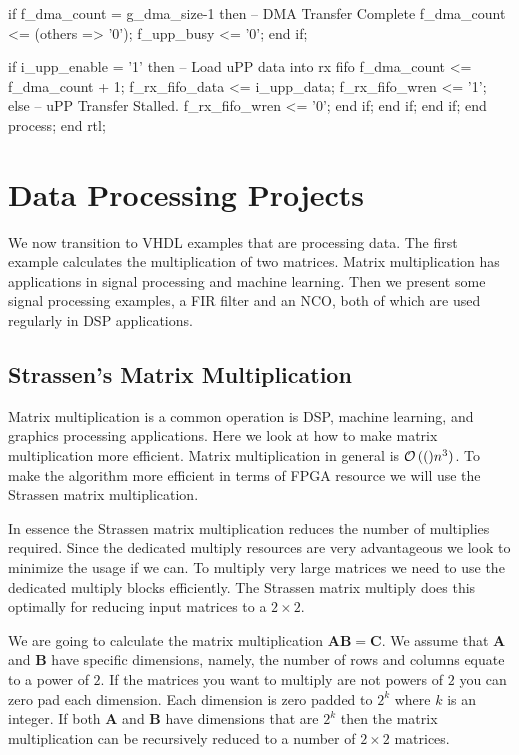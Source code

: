\begin{VHDLlisting}[tabsize=2]
                if f_dma_count = g_dma_size-1 then
                    -- DMA Transfer Complete
                    f_dma_count <= (others => '0');
                    f_upp_busy <= '0';
                end if;
			
                if i_upp_enable = '1' then
                    -- Load uPP data into rx fifo
                    f_dma_count <= f_dma_count + 1;
                    f_rx_fifo_data <= i_upp_data;
                    f_rx_fifo_wren <= '1';
                else
                    -- uPP Transfer Stalled.
                    f_rx_fifo_wren <= '0';
                end if;
            end if;
        end if;
    end process;	
end rtl;
\end{VHDLlisting}

\section{Data Processing Projects}
	
We now transition to \ac{VHDL} examples that are processing data. The first example calculates the multiplication of two matrices. Matrix multiplication has applications in signal processing and machine learning. Then we present some signal processing examples, a \ac{FIR} filter and an \ac{NCO}, both of which are used regularly in \ac{DSP} applications. 

\subsection{Strassen's Matrix Multiplication}
	
Matrix multiplication is a common operation is \ac{DSP}, machine learning, and graphics processing applications. Here we look at how to make matrix multiplication more efficient. Matrix multiplication in general is ${{\mathcal{O}}\left( ( \right)}n^3)$. To make the algorithm more efficient in terms of \ac{FPGA} resource we will use the Strassen matrix multiplication. 

In essence the Strassen matrix multiplication reduces the number of multiplies required. Since the dedicated multiply resources are very advantageous we look to minimize the usage if we can. To multiply very large matrices we need to use the dedicated multiply blocks efficiently. The Strassen matrix multiply does this optimally for reducing input matrices to a $2 \times 2$.

We are going to calculate the matrix multiplication $\mathbf{A}\mathbf{B}=\mathbf{C}$. We assume that $\mathbf{A}$ and $\mathbf{B}$ have specific dimensions, namely, the number of rows and columns equate to a power of $2$. If the matrices you want to multiply are not powers of $2$ you can zero pad each dimension. Each dimension is zero padded to $2^k$ where $k$ is an integer. If both $\mathbf{A}$ and $\mathbf{B}$ have dimensions that are $2^k$ then the matrix multiplication can be recursively reduced to a number of $2 \times 2$ matrices. 

